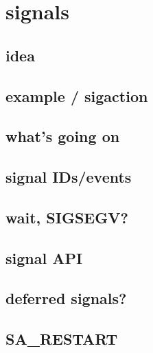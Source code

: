 \section{signals}

\subsection{idea}



\subsection{example / sigaction}



\subsection{what's going on}




\subsection{signal IDs/events}




\subsection{wait, SIGSEGV?}



\subsection{signal API}



\subsection{deferred signals?}


\subsection{SA\_RESTART}

